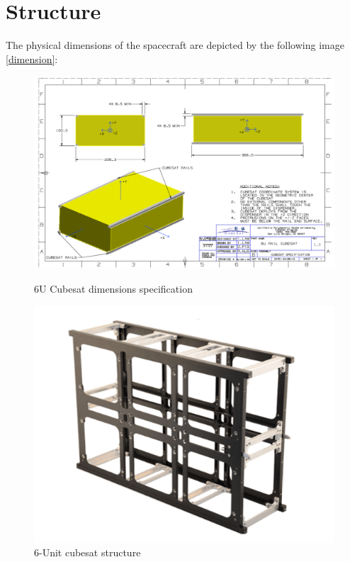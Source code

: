 \documentclass[11pt]{article}
\begin{document}
\section{Structure}
The physical dimensions of the spacecraft are  depicted by the following image \ref{dimension}: 
\begin{figure} [H]
\begin{minipage}[b]{.68 \textwidth}


\includegraphics[width=\textwidth]{Geometry.PNG}


\caption{ 6U Cubesat dimensions specification \cite{6u dimension}}
\label{dimension}

\end{minipage}
\begin{minipage}[b]{.37 \textwidth}

\centering 

\includegraphics[width=\textwidth]{box.PNG} 
\caption{ 6-Unit cubesat structure
\cite{structure}}
\label{structures}
\end{minipage}
\end{figure}
\end{document}
